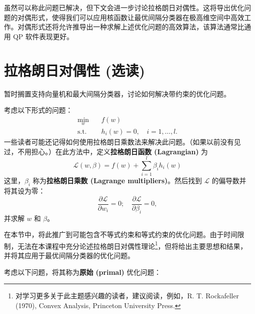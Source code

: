 虽然可以称此问题已解决，但下文会进一步讨论拉格朗日对偶性。这将导出优化问题的对偶形式，使得我们可以应用核函数让最优间隔分类器在极高维空间中高效工作。对偶形式还将允许推导出一种求解上述优化问题的高效算法，该算法通常比通用 QP 软件表现更好。

\section{拉格朗日对偶性 (选读)}

暂时搁置支持向量机和最大间隔分类器，讨论如何解决带约束的优化问题。

考虑以下形式的问题：
\begin{align*}
    \min_w \quad &f(w)\\
    \text{s.t.} \quad &h_i(w)=0,\quad i=1,\dots,l.
\end{align*}
一些读者可能还记得如何使用拉格朗日乘数法来解决此问题。（如果以前没有见过，不用担心。）在此方法中，定义\textbf{拉格朗日函数 (Lagrangian)} 为
\[
    \mathcal{L}(w, \beta) = f(w) + \sum_{i=1}^l \beta_i h_i(w)
\]
这里，$\beta_i$ 称为\textbf{拉格朗日乘数 (Lagrange multipliers)}。然后找到 $\mathcal{L}$ 的偏导数并将其设为零：
\[
    \frac{\partial \mathcal{L}}{\partial w_i} = 0; \quad \frac{\partial \mathcal{L}}{\partial \beta_i} = 0,
\]
并求解 $w$ 和 $\beta$。

在本节中，将此推广到可能包含不等式约束和等式约束的优化问题。由于时间限制，无法在本课程中充分论述拉格朗日对偶性理论\footnote{对学习更多关于此主题感兴趣的读者，建议阅读，例如，R. T. Rockafeller (1970), Convex Analysis, Princeton University Press.}，但将给出主要思想和结果，并将其应用于最优间隔分类器的优化问题。

考虑以下问题，将其称为\textbf{原始 (primal)} 优化问题：

